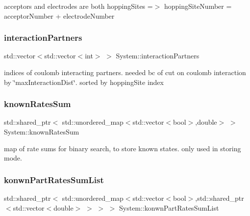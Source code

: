 acceptors and electrodes are both hopping\+Sites =$>$ hopping\+Site\+Number = acceptor\+Number + electrode\+Number \mbox{\label{classSystem_a7938c9208ca6b86c4d1629418aabd98f}} 
\subsubsection{\texorpdfstring{interaction\+Partners}{interactionPartners}}
{\footnotesize\ttfamily std\+::vector$<$std\+::vector$<$int$>$ $>$ System\+::interaction\+Partners\hspace{0.3cm}{\ttfamily [private]}}

indices of coulomb interacting partners. needed bc of cut on coulomb interaction by \char`\"{}max\+Interaction\+Dist\char`\"{}. sorted by hopping\+Site index \mbox{\label{classSystem_af23703acd38834ecb9381425724f4ca5}} 
\subsubsection{\texorpdfstring{known\+Rates\+Sum}{knownRatesSum}}
{\footnotesize\ttfamily std\+::shared\+\_\+ptr$<$ std\+::unordered\+\_\+map$<$std\+::vector$<$bool$>$,double$>$ $>$ System\+::known\+Rates\+Sum\hspace{0.3cm}{\ttfamily [private]}}

map of rate sums for binary search, to store known states. only used in storing mode. \mbox{\label{classSystem_a9892a3f67a51872cce3577ec50a55a5d}} 
\subsubsection{\texorpdfstring{konwn\+Part\+Rates\+Sum\+List}{konwnPartRatesSumList}}
{\footnotesize\ttfamily std\+::shared\+\_\+ptr$<$ std\+::unordered\+\_\+map$<$std\+::vector$<$bool$>$,std\+::shared\+\_\+ptr$<$std\+::vector$<$double$>$ $>$ $>$ $>$ System\+::konwn\+Part\+Rates\+Sum\+List\hspace{0.3cm}{\ttfamily [private]}}

